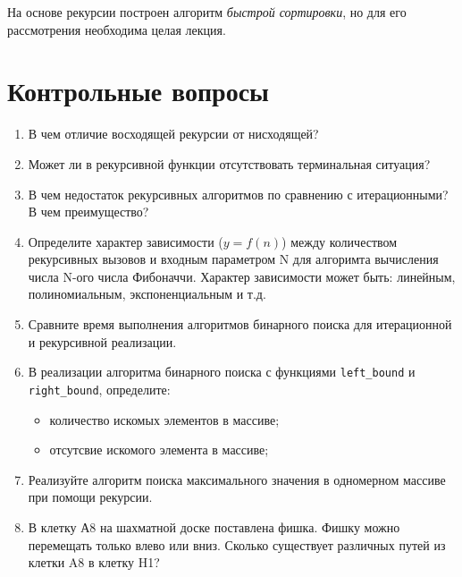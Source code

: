 \documentclass[12pt,a4paper]{article}
\begin{document}
На основе рекурсии построен алгоритм \textit{быстрой сортировки}, но для его рассмотрения необходима целая лекция. 

\section*{Контрольные вопросы}

\begin{enumerate}
	\item В чем отличие восходящей рекурсии от нисходящей?
	\item Может ли в рекурсивной функции отсутствовать терминальная ситуация?
	\item В чем недостаток рекурсивных алгоритмов по сравнению с итерационными? В чем преимущество?
	\item Определите характер зависимости ($y=f(n)$) между количеством рекурсивных вызовов и входным параметром N для алгоримта вычисления числа N-ого числа Фибоначчи. Характер зависимости может быть: линейным, полиномиальным, экспоненциальным и т.д.
	\item Сравните время выполнения алгоритмов бинарного поиска для итерационной и рекурсивной реализации.
	\item В реализации алгоритма бинарного поиска с функциями \texttt{left\_bound} и \texttt{right\_bound}, определите: 
	\begin{itemize}
	\item количество искомых элементов в массиве;
	\item отсутсвие искомого элемента в массиве;	
	\end{itemize}		
	\item Реализуйте алгоритм поиска максимального значения в одномерном массиве при помощи рекурсии.
	\item В клетку А8 на шахматной доске поставлена фишка. Фишку можно перемещать только влево или вниз. Сколько существует различных путей из клетки A8 в клетку H1?
\end{enumerate}
\end{document}
